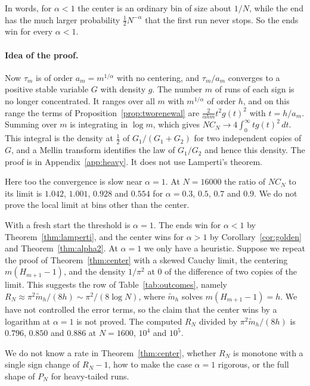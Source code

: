 In words, for $\alpha<1$ the center is an ordinary bin of size about $1/N$,
while the end has the much larger probability $\frac12N^{-\alpha}$ that the
first run never stops. So the ends win for every $\alpha<1$.

\paragraph{Idea of the proof.}
Now $\tau_m$ is of order $a_m=m^{1/\alpha}$ with no centering, and $\tau_m/a_m$
converges to a positive stable variable $G$ with density $g$. The number $m$
of runs of each sign is no longer concentrated. It ranges over all $m$ with
$m^{1/\alpha}$ of order $h$, and on this range the terms of
Proposition~\ref{prop:tworenewal} are $\frac2{\alpha hm}t^2g(t)^2$ with
$t=h/a_m$. Summing over $m$ is integrating in $\log m$, which gives
$NC_N\to4\int_0^\infty tg(t)^2\,dt$. This integral is the density at
$\frac12$ of $G_1/(G_1+G_2)$ for two independent copies of $G$, and a Mellin
transform identifies the law of $G_1/G_2$ and hence this density. The proof
is in Appendix~\ref{app:heavy}. It does not use Lamperti's theorem.

Here too the convergence is slow near $\alpha=1$. At $N=16000$ the ratio of
$NC_N$ to its limit is $1.042$, $1.001$, $0.928$ and $0.554$ for
$\alpha=0.3$, $0.5$, $0.7$ and $0.9$. We do not prove the local limit at
bins other than the center.

\begin{remark}[the exponent $\alpha=1$ and the fresh start]\label{rem:other}
With a fresh start the threshold is $\alpha=1$. The ends win for $\alpha<1$
by Theorem~\ref{thm:lamperti}, and the center wins for $\alpha>1$ by
Corollary~\ref{cor:golden} and Theorem~\ref{thm:alpha2}. At $\alpha=1$ we
only have a heuristic. Suppose we repeat the proof of
Theorem~\ref{thm:center} with a skewed Cauchy limit, the centering
$m(H_{m+1}-1)$, and the density $1/\pi^2$ at $0$ of the difference of two
copies of the limit. This suggests the row of Table~\ref{tab:outcomes},
namely $R_N\approx\pi^2\tilde m_h/(8h)\sim\pi^2/(8\log N)$, where
$\tilde m_h$ solves $m(H_{m+1}-1)=h$. We have not controlled the error
terms, so the claim that the center wins by a logarithm at $\alpha=1$ is not
proved. The computed $R_N$ divided by $\pi^2\tilde m_h/(8h)$ is $0.796$,
$0.850$ and $0.886$ at $N=1600$, $10^4$ and $10^5$.
\end{remark}

We do not know a rate in Theorem~\ref{thm:center}, whether $R_N$ is monotone
with a single sign change of $R_N-1$, how to make the case $\alpha=1$
rigorous, or the full shape of $P_N$ for heavy-tailed runs.
